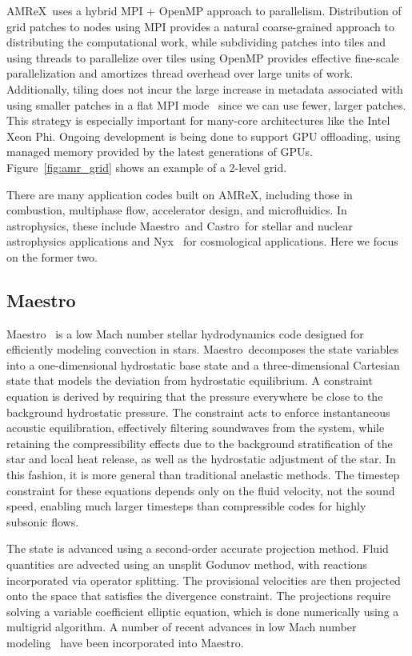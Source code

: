 \documentclass[a4paper]{jpconf}
\newcommand{\maestro}{{\sffamily Maestro}}
\newcommand{\castro}{{\sffamily Castro}}
\newcommand{\nyx}{{\sffamily Nyx}}
\newcommand{\amrex}{{\sffamily AMReX}}
\begin{document}
\amrex\ uses a hybrid MPI + OpenMP approach to parallelism.
Distribution of grid patches to nodes using MPI provides a natural
coarse-grained approach to distributing the computational work, while
subdividing patches into tiles and using threads to parallelize over
tiles using OpenMP provides effective fine-scale parallelization and
amortizes thread overhead over large units of work.  Additionally,
tiling does not incur the large increase in metadata
associated with using smaller patches in a flat MPI
mode~\cite{tiling} since we can use fewer, larger patches.
This strategy is especially important for
many-core architectures like the Intel Xeon Phi.  Ongoing development is being
done to support GPU offloading, using managed memory provided by the
latest generations of GPUs.  Figure~\ref{fig:amr_grid} shows an
example of a 2-level grid.

There are many application codes built on \amrex, including those in
combustion, multiphase flow, accelerator design, and microfluidics. In
astrophysics, these include \maestro\ and \castro\ for stellar and
nuclear astrophysics applications and \nyx~\cite{nyx} for cosmological
applications.  Here we focus on the former two.

\subsection{\maestro}

\maestro~\cite{MAESTRO:Multilevel} is a low Mach number stellar
hydrodynamics code designed for efficiently modeling convection in
stars.  \maestro\ decomposes the state variables into a one-dimensional
hydrostatic base state and a three-dimensional Cartesian state that
models the deviation from hydrostatic equilibrium.
A constraint equation is derived by
requiring that the pressure everywhere be close to the background
hydrostatic pressure.  The constraint acts to enforce instantaneous
acoustic equilibration, effectively filtering soundwaves from the
system, while retaining the compressibility effects due to the
background stratification of the star and local heat release, as well
as the hydrostatic adjustment of the star.  In this fashion, it is
more general than traditional anelastic methods.  The timestep
constraint for these equations depends only on the fluid velocity, not
the sound speed, enabling much larger timesteps than compressible
codes for highly subsonic flows.

The state is advanced using a second-order accurate projection method.
Fluid quantities are advected using an unsplit Godunov method, with
reactions incorporated via operator splitting.  The provisional
velocities are then projected onto the space that satisfies the
divergence constraint.  The projections require solving a variable
coefficient elliptic equation, which is done numerically using a
multigrid algorithm.  A number of recent advances in low Mach number
modeling~\cite{kleinpauluis,vasil:2013} have been incorporated into
\maestro.
\end{document}
